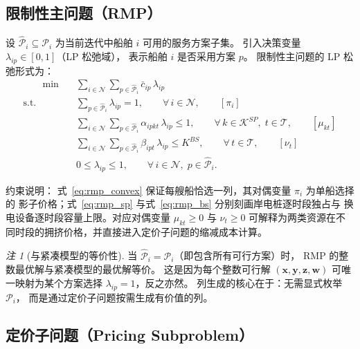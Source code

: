 \documentclass[UTF8, a4paper, 12pt]{ctexart}
\theoremstyle{plain}
\theoremstyle{definition}
\theoremstyle{remark}
\newtheorem{remark}{注}
\begin{document}
\subsection{限制性主问题（RMP）}
\label{sec:cg_rmp}

设 $\hat{\mathcal{P}}_i \subseteq \mathcal{P}_i$ 为当前迭代中船舶 $i$
可用的服务方案子集。
引入决策变量 $\lambda_{ip} \in [0,1]$（LP 松弛域），
表示船舶 $i$ 是否采用方案 $p$。
限制性主问题的 LP 松弛形式为：
\begin{align}
  [\text{RMP}] \qquad
  \min \quad & \sum_{i \in \mathcal{N}} \sum_{p \in \hat{\mathcal{P}}_i}
    \bar{c}_{ip}\, \lambda_{ip}
  \label{eq:rmp_obj} \\
  \text{s.t.} \quad
  & \sum_{p \in \hat{\mathcal{P}}_i} \lambda_{ip} = 1,
    \qquad \forall\, i \in \mathcal{N},
    \qquad [\pi_i]
  \label{eq:rmp_convex} \\
  & \sum_{i \in \mathcal{N}} \sum_{p \in \hat{\mathcal{P}}_i}
    \alpha_{ipkt}\, \lambda_{ip} \le 1,
    \qquad \forall\, k \in \mathcal{K}^{SP},\; t \in \mathcal{T},
    \qquad [\mu_{kt}]
  \label{eq:rmp_sp} \\
  & \sum_{i \in \mathcal{N}} \sum_{p \in \hat{\mathcal{P}}_i}
    \beta_{ipt}\, \lambda_{ip} \le K^{BS},
    \qquad \forall\, t \in \mathcal{T},
    \qquad [\nu_t]
  \label{eq:rmp_bs} \\
  & 0 \le \lambda_{ip} \le 1,
    \qquad \forall\, i \in \mathcal{N},\; p \in \hat{\mathcal{P}}_i.
  \label{eq:rmp_bound}
\end{align}

\noindent 约束说明：
式~\eqref{eq:rmp_convex} 保证每艘船恰选一列，其对偶变量 $\pi_i$ 为单船选择的
影子价格；式~\eqref{eq:rmp_sp} 与式~\eqref{eq:rmp_bs} 分别刻画岸电桩逐时段独占与
换电设备逐时段容量上限。对应对偶变量 $\mu_{kt} \ge 0$ 与 $\nu_t \ge 0$
可解释为两类资源在不同时段的拥挤价格，并直接进入定价子问题的缩减成本计算。

\begin{remark}[与紧凑模型的等价性]
当 $\hat{\mathcal{P}}_i = \mathcal{P}_i$（即包含所有可行方案）时，
RMP 的整数最优解与紧凑模型的最优解等价。
这是因为每个整数可行解
$(\mathbf{x}, \mathbf{y}, \mathbf{z}, \mathbf{w})$
可唯一映射为某个方案选择 $\lambda_{ip} = 1$，反之亦然。
列生成的核心在于：无需显式枚举 $\mathcal{P}_i$，
而是通过定价子问题按需生成有价值的列。
\end{remark}

\subsection{定价子问题（Pricing Subproblem）}
\label{sec:cg_pricing}
\end{document}
